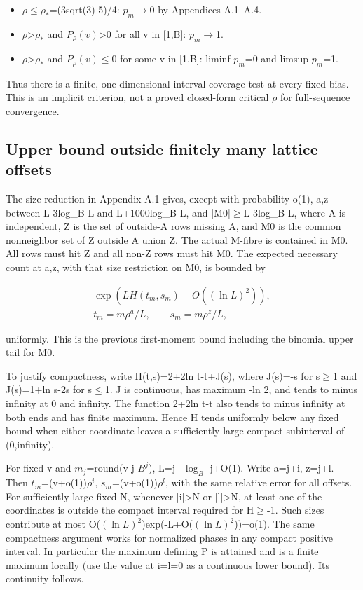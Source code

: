 \documentclass[11pt]{article}
\begin{document}
\begin{itemize}
\item $\rho$\ensuremath{\leq}$\rho_{*}$=(3sqrt(3)-5)/4: $p_m$\ensuremath{\to}0 by Appendices A.1--A.4.
\item $\rho$>$\rho_{*}$ and $P_\rho(v)$>0 for all v in [1,B]: $p_m$\ensuremath{\to}1.
\item $\rho$>$\rho_{*}$ and $P_\rho(v)$\ensuremath{\leq}0 for some v in [1,B]: liminf $p_m$=0 and limsup $p_m$=1.
\end{itemize}

Thus there is a finite, one-dimensional interval-coverage test at every fixed bias. This is an implicit criterion, not a proved closed-form critical $\rho$ for full-sequence convergence.

\subsection{Upper bound outside finitely many lattice offsets}

The size reduction in Appendix A.1 gives, except with probability o(1), a,z between L-3log\_B L and L+1000log\_B L, and |M0|\ensuremath{\geq}L-3log\_B L, where A is independent, Z is the set of outside-A rows missing A, and M0 is the common nonneighbor set of Z outside A union Z. The actual M-fibre is contained in M0. All rows must hit Z and all non-Z rows must hit M0. The expected necessary count at a,z, with that size restriction on M0, is bounded by

\[
\begin{gathered}\exp(LH(t_m,s_m)+O((\ln L)^2)),\\
t_m=m\rho^a/L,\qquad s_m=m\rho^z/L,\end{gathered}
\]

uniformly. This is the previous first-moment bound including the binomial upper tail for M0.

To justify compactness, write H(t,s)=2+2ln t-t+J(s), where J(s)=-s for s\ensuremath{\geq}1 and J(s)=1+ln s-2s for s\ensuremath{\leq}1. J is continuous, has maximum -ln 2, and tends to minus infinity at 0 and infinity. The function 2+2ln t-t also tends to minus infinity at both ends and has finite maximum. Hence H tends uniformly below any fixed bound when either coordinate leaves a sufficiently large compact subinterval of (0,infinity).

For fixed v and $m_{j}$=round(v j $B^{j}$), L=j+$\log_B$ j+O(1). Write a=j+i, z=j+l. Then $t_{m}$=(v+o(1))$\rho^{i}$, $s_{m}$=(v+o(1))$\rho^{l}$, with the same relative error for all offsets. For sufficiently large fixed N, whenever |i|>N or |l|>N, at least one of the coordinates is outside the compact interval required for H\ensuremath{\geq}-1. Such sizes contribute at most O($(\ln L)^2$)exp(-L+O($(\ln L)^2$))=o(1). The same compactness argument works for normalized phases in any compact positive interval. In particular the maximum defining P is attained and is a finite maximum locally (use the value at i=l=0 as a continuous lower bound). Its continuity follows.
\end{document}
